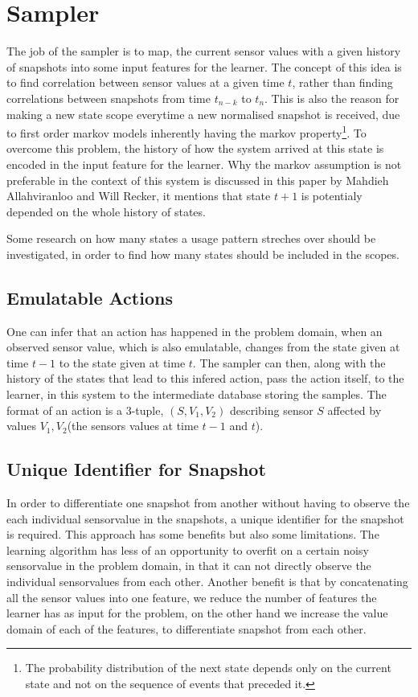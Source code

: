 \section{Sampler}\label{sec:sampler}
The job of the sampler is to map, the current sensor values with a given history of snapshots into some input features for the learner.
The concept of this idea is to find correlation between sensor values at a given time $t$, rather than finding correlations between snapshots from time $t_{n-k}$ to $t_n$. This is also the reason for making a new state scope everytime a new normalised snapshot is received, due to first order markov models inherently having the markov property\footnote{The probability distribution of the next state depends only on the current state and not on the sequence of events that preceded it.\cite{wiki_markov_chain}}. To overcome this problem, the history of how the system arrived at this state is encoded in the input feature for the learner. Why the markov assumption is not preferable in the context of this system is discussed in this paper\cite{Allahviranloo201316} by Mahdieh Allahviranloo and Will Recker, it mentions that state $t+1$ is potentialy depended on the whole history of states.

Some research on how many states a usage pattern streches over should be investigated, in order to find how many states should be included in the scopes.

\subsection{Emulatable Actions}
One can infer that an action has happened in the problem domain, when an observed sensor value, which is also emulatable, changes from the state given at time $t-1$ to the state given at time $t$. The sampler can then, along with the history of the states that lead to this infered action, pass the action itself, to the learner, in this system to the intermediate database storing the samples. The format of an action is a 3-tuple, $(S,V_1,V_2)$ describing sensor $S$ affected by values $V_1, V_2$(the sensors values at time $t-1$ and $t$).

\subsection{Unique Identifier for Snapshot}

In order to differentiate one snapshot from another without having to observe the each individual sensorvalue in the snapshots, a unique identifier for the snapshot is required.
This approach has some benefits but also some limitations. The learning algorithm has less of an opportunity to overfit on a certain noisy sensorvalue in the problem domain, in that it can not directly observe the individual sensorvalues from each other.
Another benefit is that by concatenating all the sensor values into one feature, we reduce the number of features the learner has as input for the problem, on the other hand we increase the value domain of each of the features, to differentiate snapshot from each other.

